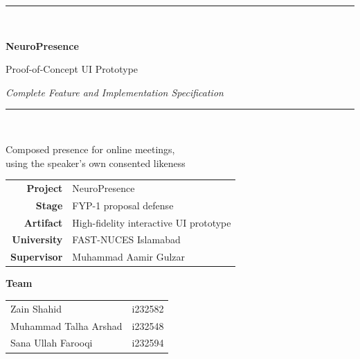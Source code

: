 \documentclass[11pt,a4paper]{report}
\begin{document}
\begin{titlepage}
\centering
\vspace*{2.2cm}

{\color{npPrimary}\rule{\linewidth}{2pt}}\\[10pt]
{\Huge\bfseries NeuroPresence\par}
\vspace{6pt}
{\Large Proof-of-Concept UI Prototype\par}
\vspace{4pt}
{\large\itshape Complete Feature and Implementation Specification\par}
{\color{npPrimary}\rule{\linewidth}{2pt}}\\[26pt]

{\large Composed presence for online meetings,\\ using the speaker's own consented likeness\par}
\vspace{28pt}

\begin{tabular}{rl}
\toprule
\textbf{Project} & NeuroPresence \\
\textbf{Stage} & FYP-1 proposal defense \\
\textbf{Artifact} & High-fidelity interactive UI prototype \\
\textbf{University} & FAST-NUCES Islamabad \\
\textbf{Supervisor} & Muhammad Aamir Gulzar \\
\bottomrule
\end{tabular}

\vspace{20pt}
{\bfseries Team}\\[4pt]
\begin{tabular}{ll}
\toprule
Zain Shahid & i232582 \\
Muhammad Talha Arshad & i232548 \\
Sana Ullah Farooqi & i232594 \\
\bottomrule
\end{tabular}

\vfill


\end{titlepage}
\end{document}
